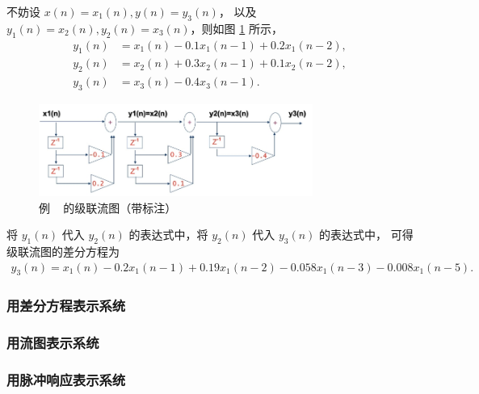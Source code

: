 \begin{solution}
    不妨设 $x(n) = x_1(n), y(n) = y_3(n)$，
    以及 $y_1(n) = x_2(n), y_2(n) = x_3(n)$，则如图 \ref{fig:serial-flow-chart-annotated} 所示，
    \begin{align*}
        y_1(n) & = x_1(n) - 0.1x_1(n - 1) + 0.2x_1(n - 2), \\
        y_2(n) & = x_2(n) + 0.3x_2(n - 1) + 0.1x_2(n - 2), \\
        y_3(n) & = x_3(n) - 0.4x_3(n - 1).
    \end{align*}
    \begin{figure}[H]
        \centering
        \includegraphics[width=0.8\textwidth]{chap4/img/serial_flow_chart_annotated.png}
        \caption{例 \theexample~ 的级联流图（带标注）}
        \label{fig:serial-flow-chart-annotated}
    \end{figure}
    将 $y_1(n)$ 代入 $y_2(n)$ 的表达式中，将 $y_2(n)$ 代入 $y_3(n)$ 的表达式中，
    可得级联流图的差分方程为
    \begin{align*}
        y_3(n) = x_1(n) - 0.2x_1(n - 1) + 0.19x_1(n - 2) - 0.058x_1(n - 3) - 0.008x_1(n - 5).
    \end{align*}
\end{solution}

\subsubsection{用差分方程表示系统}

\label{subsubsection:diff-equation-representation}

\subsubsection{用流图表示系统}

\label{subsubsection:flow-chart-representation}

\subsubsection{用脉冲响应表示系统}

\label{subsubsection:pulse-response-representation}

